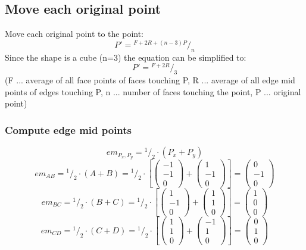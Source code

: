 \documentclass{article}
\newcommand*\rfrac[2]{{}^{#1}\!/_{#2}}%
\begin{document}
\subsection{Move each original point}
Move each original point to the point:\[P'=\rfrac{F+2R+(n-3)P}{n}\]
Since the shape is a cube (n=3) the equation can be simplified to:\[P'=\rfrac{F+2R}{3}\]
(F ... average of all face points of faces touching P, R ... average of all edge mid points of edges touching P, n ... number of faces touching the point, P ... original point)

\subsubsection{Compute edge mid points}
\[em_{P_x,P_y}=\rfrac{1}{2}\cdot(P_x+P_y)\]
\[em_{AB}=\rfrac{1}{2}\cdot(A+B)=\rfrac{1}{2}\cdot\left[
\left({\begin{array}{c} -1 \\  -1 \\ 0 \end{array}}\right)+
\left({\begin{array}{c} 1 \\  -1 \\ 0 \end{array}}\right)\right]=
\left({\begin{array}{c}  0 \\ -1 \\ 0 \end{array}}\right)
\]
\[em_{BC}=\rfrac{1}{2}\cdot(B+C)=\rfrac{1}{2}\cdot\left[
\left({\begin{array}{c} 1 \\  -1 \\ 0 \end{array}}\right)+
\left({\begin{array}{c} 1 \\  1 \\ 0 \end{array}}\right)\right]=
\left({\begin{array}{c}  1 \\ 0 \\ 0 \end{array}}\right)
\]
\[em_{CD}=\rfrac{1}{2}\cdot(C+D)=\rfrac{1}{2}\cdot\left[
\left({\begin{array}{c} 1 \\  1 \\ 0 \end{array}}\right)+
\left({\begin{array}{c} -1 \\  1 \\ 0 \end{array}}\right)\right]=
\left({\begin{array}{c}  0 \\ 1 \\ 0 \end{array}}\right)
\]
\end{document}
